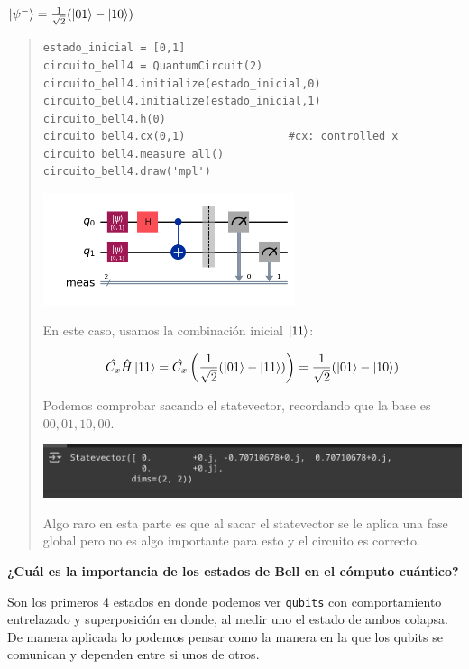 \textbf{$\ket{\psi^-}=\frac{1}{\sqrt{2}} (\ket{01}-\ket{10})$} \vspace{.3cm}

\begin{quote}
    \begin{verbatim}
estado_inicial = [0,1]
circuito_bell4 = QuantumCircuit(2)
circuito_bell4.initialize(estado_inicial,0)
circuito_bell4.initialize(estado_inicial,1)
circuito_bell4.h(0)
circuito_bell4.cx(0,1)                #cx: controlled x
circuito_bell4.measure_all()
circuito_bell4.draw('mpl')
    \end{verbatim}
    \vspace{.3cm}
    \begin{center}
        \includegraphics[height=3.3cm]{src/Img/3.3.png}
    \end{center}

    En este caso, usamos la combinación inicial $\ket{11}$:

    \begin{align*}
        \hat{C_x}\hat{H}\ket{11}
        = \hat{C_x} \left( \frac{1}{\sqrt{2}} (\ket{01}-\ket{11}) \right)
        = \frac{1}{\sqrt{2}} (\ket{01}-\ket{10})
    \end{align*}

    Podemos comprobar sacando el statevector, recordando que la base es $00,01,10,00$.
    \vspace{.5cm}

    \begin{center}
        \includegraphics[width=.8\textwidth]{src/Img/3.3.r.png}
    \end{center}

    Algo raro en esta parte es que al sacar el statevector se le aplica una fase global pero
    no es algo importante para esto y el circuito es correcto.
\end{quote}
\vspace{.3cm}


\textbf{¿Cuál es la importancia de los estados de Bell en el cómputo cuántico?}\vspace{.3cm}

Son los primeros 4 estados en donde podemos ver \texttt{qubits} con comportamiento
entrelazado y superposición en donde, al medir uno el estado de ambos colapsa. De manera aplicada
lo podemos pensar como la manera en la que los qubits se comunican y dependen entre si unos de
otros.
